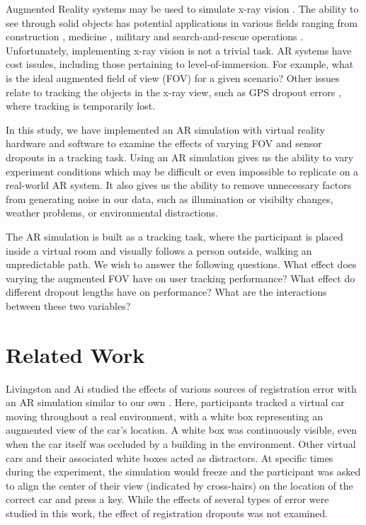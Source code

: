 \documentclass{acmsiggraph}                     %
\begin{document}


Augmented Reality systems may be used to simulate x-ray vision \cite{1383060}.  The ability to see through solid objects has potential applications in various fields ranging from construction \cite{Webster96augmentedreality}, medicine \cite{azuma95survey}, military \cite{Livingston02anaugmented} and search-and-rescue operations \cite{1528424}.  Unfortunately, implementing x-ray vision is not a trivial task.  AR systems have cost issules, including those pertaining to level-of-immersion.  For example, what is the ideal augmented field of view (FOV) for a given scenario?  Other issues relate to tracking the objects in the x-ray view, such as GPS dropout errors \cite{4079263}, where tracking is temporarily lost.

In this study, we have implemented an AR simulation with virtual reality hardware and software to examine the effects of varying FOV and sensor dropouts in a tracking task.  Using an AR simulation gives us the ability to vary experiment conditions which may be difficult or even impossible to replicate on a real-world AR system.  It also gives us the ability to remove unnecessary factors from generating noise in our data, such as illumination or visibilty changes, weather problems, or environmental distractions. 

The AR simulation is built as a tracking task, where the participant is placed inside a virtual room and visually follows a person outside, walking an unpredictable path.  We wish to answer the following questions.  What effect does varying the augmented FOV have on user tracking performance?  What effect do different dropout lengths have on performance?  What are the interactions between these two variables?

\section{Related Work}

Livingston and Ai studied the effects of various sources of registration error with an AR simulation similar to our own \cite{4637329}.  Here, participants tracked a virtual car moving throughout a real environment, with a white box representing an augmented view of the car's location.  A white box was continuously visible, even when the car itself was occluded by a building in the environment.  Other virtual cars and their associated white boxes acted as distractors.  At specific times during the experiment, the simulation would freeze and the participant was asked to align the center of their view (indicated by cross-hairs) on the location of the correct car and press a key.  While the effects of several types of error were studied in this work, the effect of registration dropouts was not examined.
\end{document}
